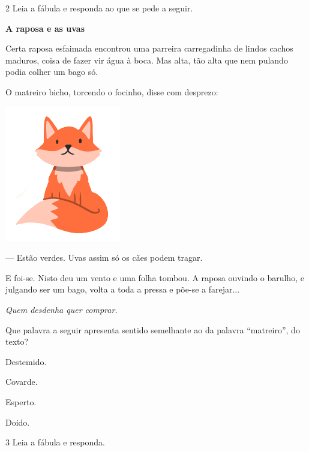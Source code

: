\num{2} Leia a fábula e responda ao que se pede a seguir.

\begin{myquote}
\textbf{A raposa e as uvas}

Certa raposa esfaimada encontrou uma parreira carregadinha de lindos cachos maduros, coisa de fazer vir água à boca. Mas alta, tão alta que nem pulando podia colher um bago só.

O matreiro bicho, torcendo o focinho, disse com desprezo:

\begin{center}
\includegraphics[width=.3\textwidth]{./media/image1e.png}
\end{center}

--- Estão verdes. Uvas assim só os cães podem tragar.

E foi-se. Nisto deu um vento e uma folha tombou. A raposa ouvindo o barulho, e julgando ser um bago, volta a toda a pressa e põe-se a farejar...

\textit{Quem desdenha quer comprar.}

\end{myquote}

Que palavra a seguir apresenta sentido semelhante ao da palavra
``matreiro'', do texto?

\begin{escolha}[itemsep=-5pt]
\item Destemido.

\item Covarde.

\item Esperto.

\item Doido.
\end{escolha}

\num{3} Leia a fábula e responda.


